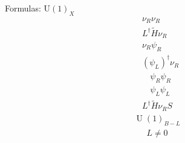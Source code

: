 Formulas:
\(   \operatorname{U(1)}_X\)
\begin{align*}&\nu_R\nu_R \\ &L^\dagger \widetilde{H} \nu_R\\ &\nu_R\psi_R\\ & (\psi_L)^\dagger \nu_R  \end{align*}
\begin{align*}&\psi_R\psi_R \\ &\psi_L\psi_L \end{align*}
\begin{align*}L^\dagger \widetilde{H} \nu_R S\end{align*}
\begin{align*}\operatorname{U}(1)_{B-L}\end{align*}
\begin{align*}L\ne 0\end{align*}

